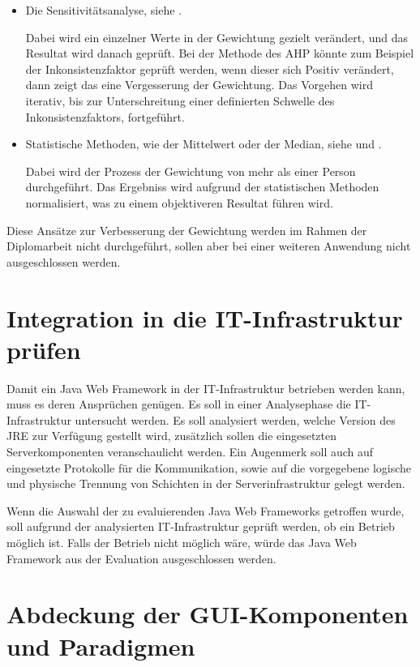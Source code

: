   \begin{itemize}
    \item Die Sensitivitätsanalyse, siehe \cite{Sensitivitaetsanalyse}.
    
    Dabei wird ein einzelner Werte in der Gewichtung gezielt verändert, und das
    Resultat wird danach geprüft. Bei der Methode des \ac{AHP} könnte zum
    Beispiel der Inkonsistenzfaktor geprüft werden, wenn dieser sich Positiv
    verändert, dann zeigt das eine Vergesserung der Gewichtung. Das Vorgehen
    wird iterativ, bis zur Unterschreitung einer definierten Schwelle des
    Inkonsistenzfaktors, fortgeführt.
    
    \item Statistische Methoden, wie der Mittelwert oder der Median, siehe
    \cite{Median} und \cite{Mittelwert}.
    
    Dabei wird der Prozess der Gewichtung von mehr als einer Person
    durchgeführt. Das Ergebniss wird aufgrund der statistischen Methoden
    normalisiert, was zu einem objektiveren Resultat führen wird.
  \end{itemize}
  
  Diese Ansätze zur Verbesserung der Gewichtung werden im Rahmen der
  Diplomarbeit nicht durchgeführt, sollen aber bei einer weiteren Anwendung
  nicht ausgeschlossen werden.
  
  \section{Integration in die IT-Infrastruktur prüfen}
  
  Damit ein Java Web Framework in der IT-Infrastruktur betrieben werden kann,
  muss es deren Ansprüchen genügen. Es soll in einer Analysephase die
  IT-Infrastruktur untersucht werden. Es soll analysiert werden, welche Version
  des \ac{JRE} zur Verfügung gestellt wird, zusätzlich sollen die eingesetzten
  Serverkomponenten veranschaulicht werden. Ein Augenmerk soll auch auf
  eingesetzte Protokolle für die Kommunikation, sowie auf die vorgegebene
  logische und physische Trennung von Schichten in der Serverinfrastruktur
  gelegt werden.
  
  Wenn die Auswahl der zu evaluierenden Java Web Frameworks getroffen wurde,
  soll aufgrund der analysierten IT-Infrastruktur geprüft werden, ob ein Betrieb
  möglich ist. Falls der Betrieb nicht möglich wäre, würde das Java Web
  Framework aus der Evaluation ausgeschlossen werden.
  
  \section{Abdeckung der GUI-Komponenten und Paradigmen}
  
